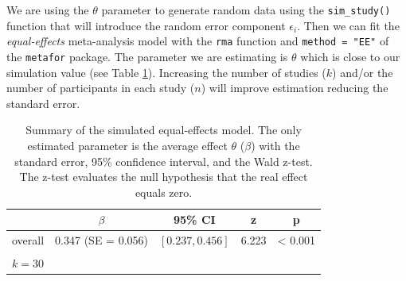 \documentclass[
  man,floatsintext]{apa6}
\newenvironment{Shaded}{\begin{snugshade}}{\end{snugshade}}
\newcommand{\AttributeTok}[1]{\textcolor[rgb]{0.13,0.29,0.53}{#1}}
\newcommand{\CommentTok}[1]{\textcolor[rgb]{0.56,0.35,0.01}{\textit{#1}}}
\newcommand{\DecValTok}[1]{\textcolor[rgb]{0.00,0.00,0.81}{#1}}
\newcommand{\FloatTok}[1]{\textcolor[rgb]{0.00,0.00,0.81}{#1}}
\newcommand{\FunctionTok}[1]{\textcolor[rgb]{0.13,0.29,0.53}{\textbf{#1}}}
\newcommand{\NormalTok}[1]{#1}
\newcommand{\OtherTok}[1]{\textcolor[rgb]{0.56,0.35,0.01}{#1}}
\newcommand{\SpecialCharTok}[1]{\textcolor[rgb]{0.81,0.36,0.00}{\textbf{#1}}}
\newcommand{\StringTok}[1]{\textcolor[rgb]{0.31,0.60,0.02}{#1}}
\begin{document}
\scriptsize

\begin{Shaded}
\end{Shaded}

\normalsize

We are using the \(\theta\) parameter to generate random data using the \texttt{sim\_study()} function that will introduce the random error component \(\epsilon_{i}\). Then we can fit the \emph{equal-effects} meta-analysis model with the \texttt{rma} function and \texttt{method\ =\ "EE"} of the \texttt{metafor} package. The parameter we are estimating is \(\theta\) which is close to our simulation value (see Table \ref{tab:res-equal-effects}). Increasing the number of studies (\(k\)) and/or the number of participants in each study (\(n\)) will improve estimation reducing the standard error.

\scriptsize

\begin{table}[H]

\caption{\label{tab:res-equal-effects}Summary of the simulated equal-effects model. The only estimated parameter is the average effect \(\theta\) (\(\beta\)) with the standard error, 95\% confidence interval, and the Wald z-test. The z-test evaluates the null hypothesis that the real effect equals zero.}
\centering
\fontsize{9}{11}\selectfont
\begin{tabular}[t]{ccccc}
\toprule
 & $\beta$ & 95\% CI & z & p\\
\midrule
overall & 0.347 (SE = 0.056) & $[0.237, 0.456]$ & 6.223 & < 0.001\\
\bottomrule
\multicolumn{5}{l}{\textsuperscript{} $k = 30$}\\
\end{tabular}
\end{table}
\end{document}
